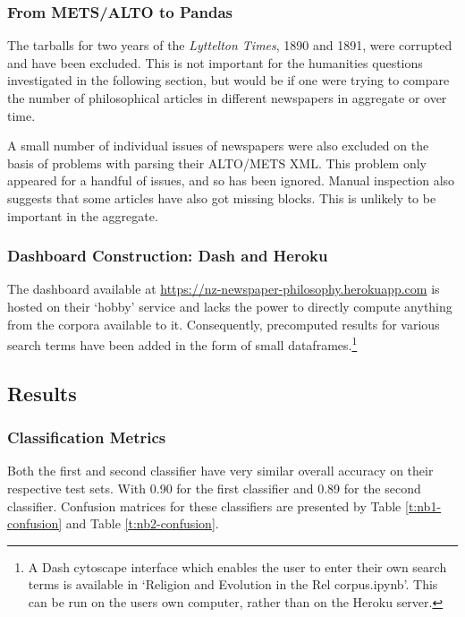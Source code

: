 \documentclass{article}
\begin{document}
\subsubsection{From METS/ALTO to Pandas}

The tarballs for two years of the \textit{Lyttelton Times}, 1890 and 1891, were corrupted and have been excluded. This is not important for the humanities questions investigated in the following section, but would be if one were trying to compare the number of philosophical articles in different newspapers in aggregate or over time.

A small number of individual issues of newspapers were also excluded on the basis of problems with parsing their ALTO/METS XML. This problem only appeared for a handful of issues, and so has been ignored. Manual inspection also suggests that some articles have also got missing blocks. This is unlikely to be important in the aggregate.

\subsubsection{Dashboard Construction: Dash and Heroku}

The dashboard available at \url{https://nz-newspaper-philosophy.herokuapp.com} is hosted on their `hobby' service and lacks the power to directly compute anything from the corpora available to it. Consequently, precomputed results for various search terms have been added in the form of small dataframes.\footnote{A Dash cytoscape interface which enables the user to enter their own search terms is available in `Religion and Evolution in the Rel corpus.ipynb'. This can be run on the users own computer, rather than on the Heroku server.}

\subsection{Results}\label{s:corpus-results}

\subsubsection{Classification Metrics}\label{s:classification-metrics}

Both the first and second classifier have very similar overall accuracy on their respective test sets. With 0.90 for the first classifier and 0.89 for the second classifier. Confusion matrices for these classifiers are presented by Table \ref{t:nb1-confusion} and Table \ref{t:nb2-confusion}.
\end{document}
